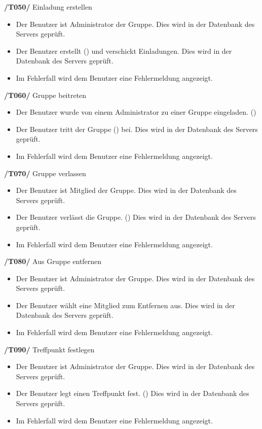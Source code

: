 \textbf{/T050/} Einladung erstellen \\
\begin{itemize}
\setlength{\itemsep}{0pt}
\item Der Benutzer ist Administrator der Gruppe. Dies wird in der Datenbank des Servers geprüft.
\item Der Benutzer erstellt () und verschickt Einladungen. Dies wird in der Datenbank des Servers geprüft.
\item Im Fehlerfall wird dem Benutzer eine Fehlermeldung angezeigt.
\end{itemize}


\textbf{/T060/} Gruppe beitreten \\
\begin{itemize}
\setlength{\itemsep}{0pt}
\item Der Benutzer wurde von einem Administrator zu einer Gruppe eingeladen. ()
\item Der Benutzer tritt der Gruppe () bei. Dies wird in der Datenbank des Servers geprüft.
\item Im Fehlerfall wird dem Benutzer eine Fehlermeldung angezeigt.
\end{itemize}


\textbf{/T070/} Gruppe verlassen \\
\begin{itemize}
\setlength{\itemsep}{0pt}
\item Der Benutzer ist Mitglied der Gruppe. Dies wird in der Datenbank des Servers geprüft.
\item Der Benutzer verlässt die Gruppe. () Dies wird in der Datenbank des Servers geprüft.
\item Im Fehlerfall wird dem Benutzer eine Fehlermeldung angezeigt.
\end{itemize}


\textbf{/T080/} Aus Gruppe entfernen \\
\begin{itemize}
\setlength{\itemsep}{0pt}
\item Der Benutzer ist Administrator der Gruppe. Dies wird in der Datenbank des Servers geprüft.
\item Der Benutzer wählt eine Mitglied zum Entfernen aus. Dies wird in der Datenbank des Servers geprüft.
\item Im Fehlerfall wird dem Benutzer eine Fehlermeldung angezeigt.
\end{itemize}


\textbf{/T090/} Treffpunkt festlegen \\
\begin{itemize}
\setlength{\itemsep}{0pt}
\item Der Benutzer ist Administrator der Gruppe. Dies wird in der Datenbank des Servers geprüft.
\item Der Benutzer legt einen Treffpunkt fest. () Dies wird in der Datenbank des Servers geprüft.
\item Im Fehlerfall wird dem Benutzer eine Fehlermeldung angezeigt.
\end{itemize}


